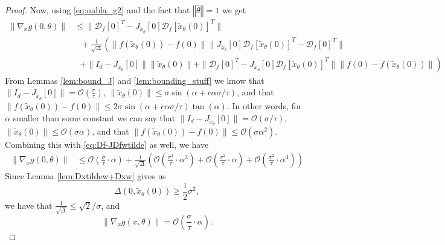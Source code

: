 \documentclass[12pt]{article}
\theoremstyle{remark}
\newcommand{\DD}{\mathcal{D}}
\newcommand{\OO}{\mathcal{O}}
\newcommand{\norm}[1]{\left\Vert #1 \right\Vert}
\newcommand{\wtilde}[1]{\widetilde{#1}}
\begin{document}
\begin{appendices}
\begin{proof}
Now, using \eqref{eq:nabla_g2} and the fact that $\norm{\bar \theta} = 1$ we get
\begin{align*}
    \|\nabla_x{g}(0,\theta)\|  &\leq\|\DD_f[0]^T - J_{\wtilde{x}_\theta}[0] \DD_f[\wtilde{x}_\theta(0)]^T\|  \\\
    &~~~
    +
    \frac{1}{\sqrt{\Delta}}
    \left( 
     \|f(\wtilde{x}_\theta(0)) - f(0)\| \|J_{\wtilde{x}_\theta}[0]\DD_f[\wtilde{x}_\theta(0)]^T - \DD_f[0]^T \| 
    \right. \\
    &~~~ \left.+ 
    \|I_d-J_{\wtilde{x}_\theta}[0]\|\|\wtilde{x}_\theta(0)\| 
    + 
    \|\DD_f[0]^T - J_{\wtilde{x}_\theta}[0]\DD_f[\wtilde{x}_\theta(0)]^T\|\|f(0)- f(\wtilde{x}_\theta(0))\|\right)
\end{align*}
From Lemmas \ref{lem:bound_J} and \ref{lem:bounding_stuff} we know that $\|I_d - J_{\wtilde x_\theta}[0]\| =\OO(\frac{\sigma}{\tau})$, $\|\wtilde x_\theta(0)\|\leq \sigma \sin(\alpha + c\alpha{\sigma/\tau} )$, and that $\|f(\wtilde x_\theta(0)) - f(0)\| \leq 2\sigma \sin(\alpha + c\alpha\sigma/\tau)\tan(\alpha)$.
In other words, for $\alpha$ smaller than some constant we can say that $\|I_d - J_{\wtilde x_\theta}[0]\| = \OO(\sigma/\tau)$, $\|\wtilde x_\theta(0)\|\leq \OO(\sigma \alpha)$, and that $\|f(\wtilde x_\theta(0)) - f(0)\| \leq \OO(\sigma \alpha^2)$.
Combining this with \eqref{eq:Df-JDfwtilde} as well, we have
\begin{align*}
    \|\nabla_x{g}(0,\theta)\| &\leq\OO(\frac{\sigma}{\tau}\cdot\alpha)
    +
    \frac{1}{\sqrt{\Delta}}
    \left( 
    \OO(\frac{\sigma^2}{\tau}\cdot\alpha^3)
    + 
    \OO(\frac{\sigma^2}{\tau}\cdot\alpha) 
    +
    \OO(\frac{\sigma^2}{\tau}\cdot\alpha^3)\right)
\end{align*}
Since Lemma \ref{lem:Dxtildew+Dxw} gives us 
\[
 \Delta(0,\wtilde x_\theta (0)) \geq \frac{1}{2} \sigma^2
,\]
we have that $\frac{1}{\sqrt{\Delta}}\leq \sqrt{2}/\sigma$, and 
\begin{equation*}
    \|\nabla_x{g}(x,\theta)\| =  \OO(\frac{\sigma}{\tau}\cdot\alpha)
.\end{equation*}
\end{proof}


\end{appendices}
\end{document}
